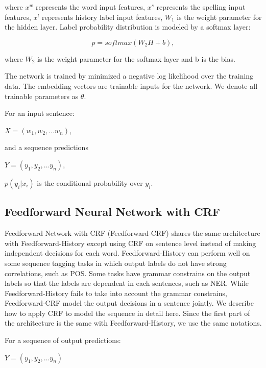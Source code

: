 \documentclass{sfuthesis}
\begin{document}
where $x^{w}$ represents the word input features, $x^{s}$ represents the spelling input features, $x^{l}$ represents history label input features, $W_{1}$ is the weight parameter for the hidden layer. Label probability distribution is modeled by a softmax layer:

\begin{equation}
p=softmax\left(W_{2}H+b\right),
\end{equation}

where $W_{2}$ is the weight parameter for the softmax layer and b is the bias.

The network is trained by minimized a negative log likelihood over the training data. The embedding vectors are trainable inputs for the network. We denote all trainable parameters as $\theta$.

For an input sentence:

\begin{center}
$X=\left( w_{1},w_{2},\ldots w_{n}\right)$, 
\end{center}

and a sequence predictions

\begin{center}
$Y=\left( y_{1},y_{2},\ldots y_{n}\right)$,
\end{center}

$p\left( y_{i}|x_{i}\right)$ is the conditional probability over $y_{i}$.

\subsection{Feedforward Neural Network with CRF}
\label{Feedforward-CRF}
Feedforward Network with CRF (Feedforward-CRF) shares the same architecture with Feedforward-History except using CRF on sentence level instead of making independent decisions for each word. Feedforward-History can perform well on some sequence tagging tasks in which output labels do not have strong correlations, such as POS. Some tasks have grammar constrains on the output labels so that the labels are dependent in each sentences, such as NER. While Feedforward-History fails to take into account the grammar constrains, Feedforward-CRF model the output decisions in a sentence jointly. We describe how to apply CRF to model the sequence in detail here. Since the first part of the architecture is the same with Feedforward-History, we use the same notations.

For a sequence of output predictions:

\begin{center}
$Y=\left( y_{1},y_{2},\ldots y_{n}\right)$
\end{center}
\end{document}
